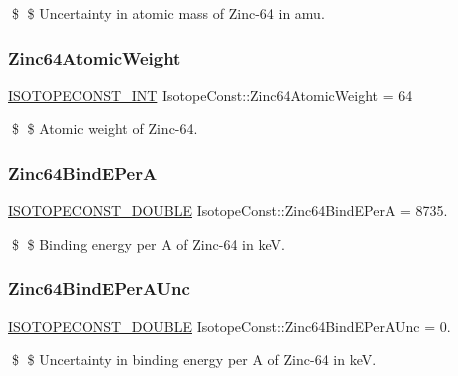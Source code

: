 \$ \$ Uncertainty in atomic mass of Zinc-\/64 in amu. \mbox{\label{group___isotope_const-_zinc-_zn64_gaa7403e628d471c1958edb68ec98e66cc}} 
\subsubsection{\texorpdfstring{Zinc64\+Atomic\+Weight}{Zinc64AtomicWeight}}
{\footnotesize\ttfamily \mbox{\hyperlink{group___isotope_const-_macros_ga5f18360b3e99483a35c32d789e62621c}{I\+S\+O\+T\+O\+P\+E\+C\+O\+N\+S\+T\+\_\+\+I\+NT}} Isotope\+Const\+::\+Zinc64\+Atomic\+Weight = 64}

\$ \$ Atomic weight of Zinc-\/64. \mbox{\label{group___isotope_const-_zinc-_zn64_ga2bede45dcc03d5bcad0a09b8699dd285}} 
\subsubsection{\texorpdfstring{Zinc64\+Bind\+E\+PerA}{Zinc64BindEPerA}}
{\footnotesize\ttfamily \mbox{\hyperlink{group___isotope_const-_macros_ga8f45a7272ce02c0b4c65c44636ed719a}{I\+S\+O\+T\+O\+P\+E\+C\+O\+N\+S\+T\+\_\+\+D\+O\+U\+B\+LE}} Isotope\+Const\+::\+Zinc64\+Bind\+E\+PerA = 8735.}

\$ \$ Binding energy per A of Zinc-\/64 in keV. \mbox{\label{group___isotope_const-_zinc-_zn64_ga6f4b67565c7492e55c063000ead7bc0f}} 
\subsubsection{\texorpdfstring{Zinc64\+Bind\+E\+Per\+A\+Unc}{Zinc64BindEPerAUnc}}
{\footnotesize\ttfamily \mbox{\hyperlink{group___isotope_const-_macros_ga8f45a7272ce02c0b4c65c44636ed719a}{I\+S\+O\+T\+O\+P\+E\+C\+O\+N\+S\+T\+\_\+\+D\+O\+U\+B\+LE}} Isotope\+Const\+::\+Zinc64\+Bind\+E\+Per\+A\+Unc = 0.}

\$ \$ Uncertainty in binding energy per A of Zinc-\/64 in keV. \mbox{\label{group___isotope_const-_zinc-_zn64_gafdea61f53e622f90505d455afec642b3}} 
